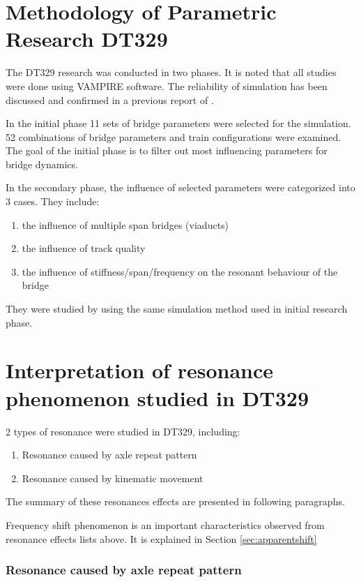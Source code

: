 \section{Methodology of Parametric Research DT329}

The DT329 research was conducted in two phases. It is noted that all studies were done using VAMPIRE software. The reliability of simulation has been discussed and confirmed in a previous report of \citet{d181rp2}.

In the initial phase 11 sets of bridge parameters were selected for the simulation. 52 combinations of bridge parameters and train configurations were examined. The goal of the initial phase is to filter out most influencing parameters for bridge dynamics.

In the secondary phase, the influence of selected parameters were categorized into 3 cases. They include:
\begin{enumerate}
 \item the influence of multiple span bridges (viaducts)
 \item the influence of track quality
 \item the influence of stiffness/span/frequency on the resonant behaviour of the bridge
\end{enumerate}
They were studied by using the same simulation method used in initial research phase.


\section{Interpretation of resonance phenomenon studied in DT329}\label{sec:resonance329}

2 types of resonance were studied in DT329, including:

\begin{enumerate}
    \item Resonance caused by axle repeat pattern
    \item Resonance caused by kinematic movement
\end{enumerate}

The summary of these resonances effects are presented in following paragraphs. 

Frequency shift phenomenon is an important characteristics observed from resonance effects lists above. It is explained in Section \ref{sec:apparentshift}

\subsubsection{Resonance caused by axle repeat pattern}

